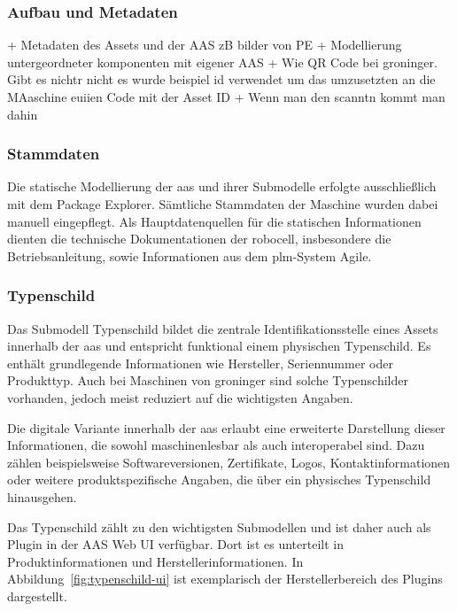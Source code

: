 \subsubsection{Aufbau und Metadaten}

+ Metadaten des Assets und der AAS zB bilder von PE
+ Modellierung untergeordneter komponenten mit eigener AAS
+ Wie QR Code bei groninger. Gibt es nichtr nicht es wurde beispiel id verwendet um das umzusetzten an die MAaschine euiien Code mit der Asset ID
+ Wenn man den scanntn kommt man dahin

\subsubsection{Stammdaten}

Die statische Modellierung der \acs{aas} und ihrer Submodelle erfolgte ausschließlich mit dem Package Explorer. 
Sämtliche Stammdaten der Maschine wurden dabei manuell eingepflegt.
Als Hauptdatenquellen für die statischen Informationen dienten die technische Dokumentationen der robocell, insbesondere die Betriebsanleitung, sowie Informationen aus dem \acs{plm}-System Agile.

\subsubsection*{Typenschild}
\vspace{-0.5em}

Das Submodell Typenschild bildet die zentrale Identifikationsstelle eines Assets innerhalb der \acs{aas} und entspricht funktional einem physischen Typenschild. 
Es enthält grundlegende Informationen wie Hersteller, Seriennummer oder Produkttyp. 
Auch bei Maschinen von groninger sind solche Typenschilder vorhanden, jedoch meist reduziert auf die wichtigsten Angaben.

Die digitale Variante innerhalb der \acs{aas} erlaubt eine erweiterte Darstellung dieser Informationen, die sowohl maschinenlesbar als auch interoperabel sind. 
Dazu zählen beispielsweise Softwareversionen, Zertifikate, Logos, Kontaktinformationen oder weitere produktspezifische Angaben, die über ein physisches Typenschild hinausgehen. 

Das Typenschild zählt zu den wichtigsten Submodellen und ist daher auch als Plugin in der AAS Web UI verfügbar. 
Dort ist es unterteilt in Produktinformationen und Herstellerinformationen. 
In Abbildung~\ref{fig:typenschild-ui} ist exemplarisch der Herstellerbereich des Plugins dargestellt.


